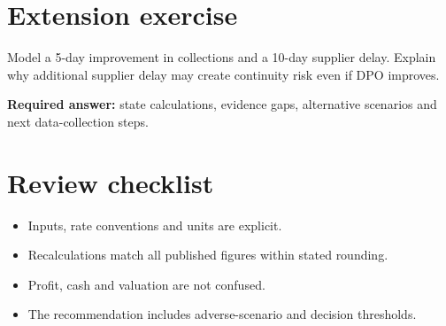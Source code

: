 \documentclass[11pt]{article}
\begin{document}
\section{Extension exercise}
Model a 5-day improvement in collections and a 10-day supplier delay. Explain why additional supplier delay may create continuity risk even if DPO improves.\par\textbf{Required answer:} state calculations, evidence gaps, alternative scenarios and next data-collection steps.
\section{Review checklist}
\begin{itemize}[leftmargin=*,itemsep=3pt]
\item Inputs, rate conventions and units are explicit.
\item Recalculations match all published figures within stated rounding.
\item Profit, cash and valuation are not confused.
\item The recommendation includes adverse-scenario and decision thresholds.
\end{itemize}
\end{document}
